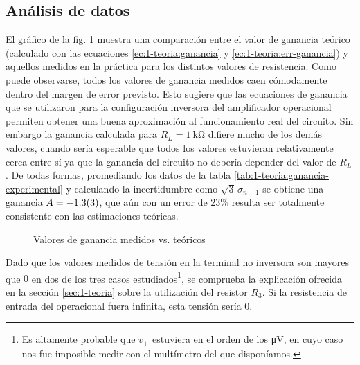 \subsection{Análisis de datos}


El gráfico de la fig. \ref{fig:1-analisis:ganancia} muestra una comparación
entre el valor de ganancia teórico (calculado con las ecuaciones 
\ref{ec:1-teoria:ganancia} y \ref{ec:1-teoria:err-ganancia}) y aquellos 
medidos en la práctica para los distintos valores de resistencia. Como puede
observarse, todos los valores de ganancia medidos caen cómodamente dentro
del margen de error previsto. Esto sugiere que las ecuaciones de ganancia
que se utilizaron para la configuración inversora del amplificador operacional
permiten obtener una buena aproximación al funcionamiento real del circuito.
Sin embargo la ganancia calculada para $R_L = \SI{1}{\kilo\ohm}$ difiere mucho
de los demás valores, cuando sería esperable que todos los valores estuvieran
relativamente cerca entre sí ya que la ganancia del circuito no debería
depender del valor de $R_L$. De todas formas, promediando los datos de la tabla
\ref{tab:1-teoria:ganancia-experimental} y calculando la incertidumbre como
$\sqrt{3}\,\sigma_{n-1}$ se obtiene una ganancia
$A = \num{-1.3 \pm 0.3}$, que aún con un error de $23\%$ resulta ser 
totalmente consistente con las estimaciones teóricas.

\begin{figure}[H]
    \centering
    
    \caption{Valores de ganancia medidos vs. teóricos}
    \label{fig:1-analisis:ganancia}
\end{figure}

Dado que los valores medidos de tensión en la terminal no inversora son
mayores que $0$ en dos de los tres casos estudiados\footnote{Es altamente
probable que $v_+$ estuviera en el orden de los \si{\micro\volt}, en cuyo
caso nos fue imposible medir con el multímetro del que disponíamos.}, se
comprueba la explicación ofrecida en la sección \ref{sec:1-teoria} sobre la
utilización del resistor $R_3$. Si la resistencia de entrada del operacional
fuera infinita, esta tensión sería 0.
